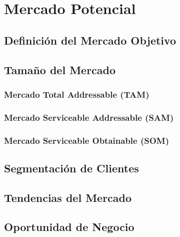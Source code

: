 
\chapter{Mercado Potencial}
\label{chap:mercado-potencial}

\section{Definición del Mercado Objetivo}
\label{sec:mercado-objetivo}

\section{Tamaño del Mercado}
\label{sec:tamano-mercado}

\subsection{Mercado Total Addressable (TAM)}
\label{subsec:tam}

\subsection{Mercado Serviceable Addressable (SAM)}
\label{subsec:sam}

\subsection{Mercado Serviceable Obtainable (SOM)}
\label{subsec:som}

\section{Segmentación de Clientes}
\label{sec:segmentacion}

\section{Tendencias del Mercado}
\label{sec:tendencias-mercado}

\section{Oportunidad de Negocio}
\label{sec:oportunidad}
